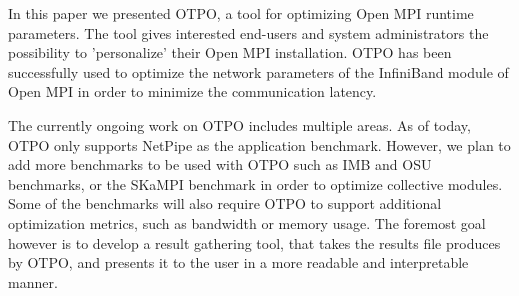 In this paper we presented OTPO, a tool for optimizing Open MPI runtime parameters. 
The tool gives interested end-users and system administrators the possibility to 'personalize' their Open MPI installation. OTPO has been successfully used to optimize the network parameters of the InfiniBand module of Open MPI in order to minimize the communication latency.

The currently ongoing work on OTPO includes multiple areas. As of today, OTPO only supports NetPipe as the application benchmark. However, we plan to add more benchmarks to be used with OTPO such as IMB and OSU benchmarks, or the SKaMPI benchmark in order to optimize collective modules. Some of the benchmarks will also require OTPO to support additional optimization metrics, such as bandwidth or memory usage. The foremost goal however is to develop a  result gathering tool, that takes the results file produces by OTPO, and presents it to the user in a more readable and interpretable manner. 
